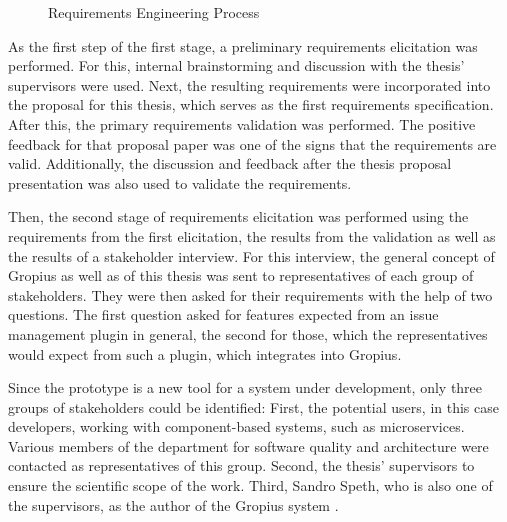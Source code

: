 \begin{figure}[!h]
	\caption{Requirements Engineering Process}
	\label{fig:requirmentsProcess}
\end{figure}

As the first step of the first stage, a preliminary requirements elicitation was performed. 
For this, internal brainstorming and discussion with the thesis' supervisors were used.
Next, the resulting requirements were incorporated into the proposal for this thesis, 
which serves as the first requirements specification.
After this, the primary requirements validation was performed. 
The positive feedback for that proposal paper was one of the signs that the requirements are valid.
Additionally, the discussion and feedback after the thesis proposal presentation was also used to validate the requirements.

Then, the second stage of requirements elicitation was performed using the requirements from the first elicitation, 
the results from the validation as well as the results of a stakeholder interview.
For this interview, the general concept of Gropius as well as of this thesis was sent to representatives of each group of stakeholders. 
They were then asked for their requirements with the help of two questions.
The first question asked for features expected from an issue management plugin in general,
the second for those, which the representatives would expect from such a plugin, which integrates into \gls{Gropius}.

Since the prototype is a new tool for a system under development, only three groups of stakeholders could be identified:
First, the potential users, in this case developers, working with component-based systems, such as microservices.
Various members of the department for software quality and architecture were contacted as representatives of this group.
Second, the thesis' supervisors to ensure the scientific scope of the work. 
Third, Sandro Speth, who is also one of the supervisors, as the author of the \gls{Gropius} system \cite{speth2020gropius}.

